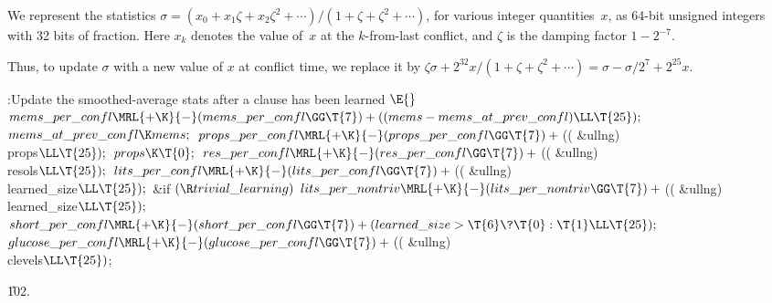 We represent the statistics $\sigma=(x_0+x_1\zeta+x_2%
\zeta^2+\cdots{})/
(1+\zeta+\zeta^2+\cdots{})$, for various integer quantities~$x$, as
64-bit unsigned integers with 32 bits of fraction. Here $x_k$ denotes
the value of~$x$ at the $k$-from-last conflict, and $\zeta$ is the
damping factor $1-2^{-7}$.

Thus, to update $\sigma$ with a new value of $x$ at conflict time,
we replace it by $\zeta\sigma+2^{32}x/(1+\zeta+\zeta^2+\cdots{})=
\sigma-\sigma/2^7+2^{25}x$.

\Y\B\4:Update the smoothed-average stats after a clause has been learned%
\X${}\E{}$\6
$\\{mems\_per\_confl}\MRL{+{\K}}{-}(\\{mems\_per\_confl}\GG\T{7})+((\\{mems}-%
\\{mems\_at\_prev\_confl})\LL\T{25});{}$\6
${}\\{mems\_at\_prev\_confl}\K\\{mems};{}$\6
${}\\{props\_per\_confl}\MRL{+{\K}}{-}(\\{props\_per\_confl}\GG\T{7})+{}$((%
\&{ullng}) \\{props}${}\LL\T{25});{}$\6
${}\\{props}\K\T{0};{}$\6
${}\\{res\_per\_confl}\MRL{+{\K}}{-}(\\{res\_per\_confl}\GG\T{7})+{}$((%
\&{ullng}) \\{resols}${}\LL\T{25});{}$\6
${}\\{lits\_per\_confl}\MRL{+{\K}}{-}(\\{lits\_per\_confl}\GG\T{7})+{}$((%
\&{ullng}) \\{learned\_size}${}\LL\T{25});{}$\6
\&{if} ${}(\R\\{trivial\_learning}){}$\1\5
${}\\{lits\_per\_nontriv}\MRL{+{\K}}{-}(\\{lits\_per\_nontriv}\GG\T{7})+{}$((%
\&{ullng}) \\{learned\_size}${}\LL\T{25});{}$\2\6
${}\\{short\_per\_confl}\MRL{+{\K}}{-}(\\{short\_per\_confl}\GG\T{7})+(%
\\{learned\_size}>\T{6}\?\T{0}:\T{1}\LL\T{25});{}$\6
${}\\{glucose\_per\_confl}\MRL{+{\K}}{-}(\\{glucose\_per\_confl}\GG\T{7})+{}$((%
\&{ullng}) \\{clevels}${}\LL\T{25}){}$;\par
\U102.\fi

